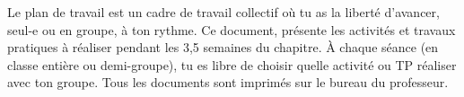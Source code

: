 \tetePremStssBiol
\reinitialiseActiviteTP
\vspace*{-8pt}

\begin{importants}
  Le plan de travail est un cadre de travail collectif où tu as la liberté d'avancer, seul-e ou en groupe, à ton rythme.  
  Ce document,  présente les activités et travaux pratiques à réaliser pendant les 3,5 semaines du chapitre.
  À chaque séance (en classe entière ou demi-groupe), tu es libre de choisir quelle activité ou TP réaliser avec ton groupe.
  Tous les documents sont imprimés sur le bureau du professeur.
\end{importants}


\vspace*{-16pt}

